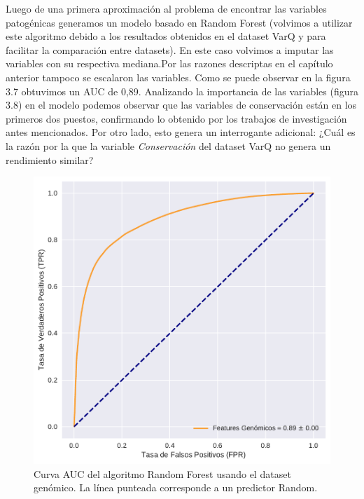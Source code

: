
Luego de una primera aproximación al problema de encontrar las variables patogénicas generamos un modelo basado en Random Forest (volvimos a utilizar este algoritmo debido a los resultados obtenidos en el dataset VarQ y para facilitar la comparación entre datasets). En este caso volvimos a imputar las variables con su respectiva mediana.Por las razones descriptas en el capítulo anterior tampoco se escalaron las variables. Como se puede observar en la figura 3.7 obtuvimos un AUC de 0,89. 
Analizando la importancia de las variables (figura 3.8) en el modelo podemos observar que las variables de conservación están en los primeros dos puestos, confirmando lo obtenido por los trabajos de investigación antes mencionados. Por otro lado, esto genera un interrogante adicional: ¿Cuál es la razón por la que la variable \textit{Conservación} del dataset VarQ no genera un rendimiento similar?


\begin{figure}[H]
    \centering
    \includegraphics[scale=0.55]{documents/latex/figures/3/auc_2.pdf}
    \caption{Curva AUC del algoritmo Random Forest usando el dataset genómico. La línea punteada corresponde a un predictor Random.}
    \label{fig:auc_2}
\end{figure}

